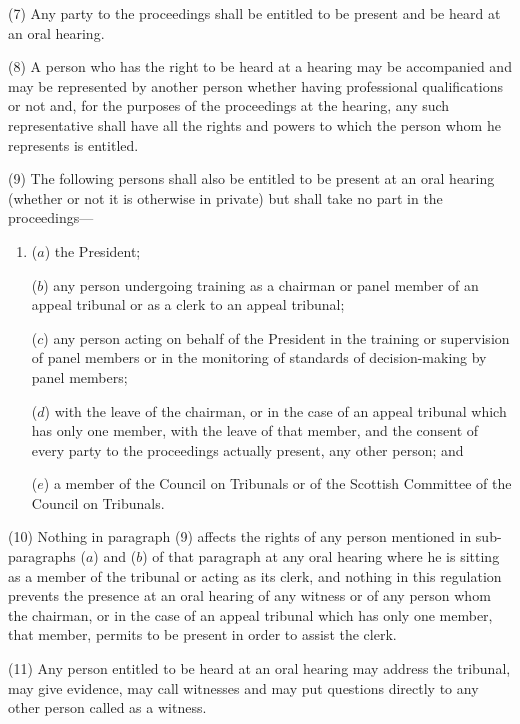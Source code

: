 \documentclass[12pt,a4paper]{article}
\begin{document}
(7) Any party to the proceedings shall be entitled to be present and be heard at an oral hearing.

(8) A person who has the right to be heard at a hearing may be accompanied and may be represented by another person whether having professional qualifications or not and, for the purposes of the proceedings at the hearing, any such representative shall have all the rights and powers to which the person whom he represents is entitled.

(9) The following persons shall also be entitled to be present at an oral hearing (whether or not it is otherwise in private) but shall take no part in the proceedings—
\begin{enumerate}\item[]
($a$) the President;

($b$) any person undergoing training as a chairman or panel member of an appeal tribunal or as a clerk to an appeal tribunal;

($c$) any person acting on behalf of the President in the training or supervision of panel members or in the monitoring of standards of decision-making by panel members;

($d$) with the leave of the chairman, or in the case of an appeal tribunal which has only one member, with the leave of that member, and the consent of every party to the proceedings actually present, any other person; and

($e$) a member of the Council on Tribunals or of the Scottish Committee of the Council on Tribunals.
\end{enumerate}

(10) Nothing in paragraph (9) affects the rights of any person mentioned in sub-paragraphs ($a$) and ($b$) of that paragraph at any oral hearing where he is sitting as a member of the tribunal or acting as its clerk, and nothing in this regulation prevents the presence at an oral hearing of any witness
or of any person whom the chairman, or in the case of an appeal tribunal which has only one member, that member, permits to be present in order to assist the clerk.  %

(11) Any person entitled to be heard at an oral hearing may address the tribunal, may give evidence, may call witnesses and may put questions directly to any other person called as a witness.
\end{document}
